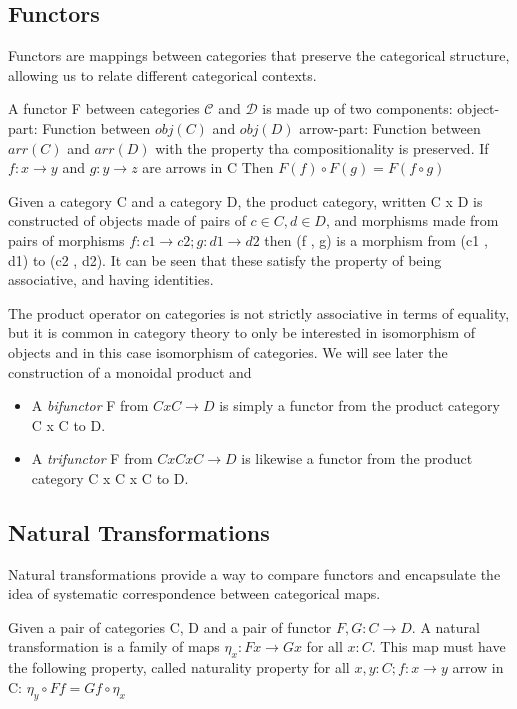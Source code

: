 \subsection{Functors}
Functors are mappings between categories that preserve the categorical
structure, allowing us to relate different categorical contexts.
\begin{definition}[Functor]
	A functor F between categories $\mathcal{C}$ and $\mathcal{D}$ is made up of two components:
	object-part: Function between $obj(C)$ and $obj(D)$
	arrow-part: Function between $arr(C)$ and $arr(D)$
	with the property tha compositionality is preserved.
	If $f : x \to y$ and $g : y \to z$ are arrows in C
	Then $F(f) \circ F(g) = F(f \circ g)$
\end{definition}
\begin{definition}
	Given a category C and a category D, the product category, written C x D is constructed of objects made of pairs of $c \in C, d \in D$, and morphisms made from pairs of morphisms $f : c1 \to c2; g : d1 \to d2$ then (f , g) is a morphism from (c1 , d1) to (c2 , d2).
	It can be seen that these satisfy the property of being associative, and having identities.
\end{definition}
The product operator on categories is not strictly associative in terms of equality, but it is common in category theory to only be interested in isomorphism of objects and in this case isomorphism of categories. We will see later the construction of a monoidal product and
\begin{definition}[Multifunctor]
	\begin{itemize}
		\item A \emph{bifunctor} F from $C x C \to D$ is simply a functor from the product category C x C to D.
		\item A \emph{trifunctor} F from $C x C x C \to D$ is likewise a functor from the product category C x C x C to D.
	\end{itemize}
\end{definition}
\subsection{Natural Transformations}
Natural transformations provide a way to compare functors and encapsulate the
idea of systematic correspondence between categorical maps.
\begin{definition}
	Given a pair of categories C, D and a pair of functor $F, G : C \to D$.
	A natural transformation is a family of maps $\eta_{x} : F x \to G x$ for
	all $x : C$.
	This map must have the following property, called naturality property for
	all $x, y : C; f : x \to y$ arrow in C:
	$\eta_y \circ F f = G f \circ \eta_x$
\end{definition}

